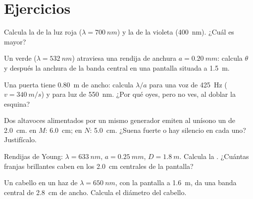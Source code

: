 \section{Ejercicios}

\begin{exercise}[$\star$]\label{exo:g12:light-as-wave:1}
Calcula la  de la luz roja ($\lambda = \qty{700}{nm}$) y la de
la violeta (\qty{400}{nm}). ¿Cuál es mayor?
\end{exercise}

\begin{exercise}[$\star$]\label{exo:g12:light-as-wave:2}
Un  verde ($\lambda = \qty{532}{nm}$) atraviesa una rendija de
anchura $a = \qty{0.20}{mm}$: calcula $\theta$ y después la anchura de
la banda central en una pantalla situada a \qty{1.5}{m}.
\end{exercise}

\begin{exercise}[$\star$]\label{exo:g12:light-as-wave:3}
Una puerta tiene \qty{0.80}{m} de ancho: calcula $\lambda/a$ para una
voz de \qty{425}{Hz} ($v = \qty{340}{m/s}$) y para luz de
\qty{550}{nm}. ¿Por qué oyes, pero no ves, al doblar la esquina?
\end{exercise}

\begin{exercise}[$\star$]\label{exo:g12:light-as-wave:4}
Dos altavoces alimentados por un mismo generador emiten al unísono un
 de  \qty{2.0}{cm}.  en $M$:
\qty{6.0}{cm}; en $N$: \qty{5.0}{cm}. ¿Suena fuerte o hay silencio en
cada uno? Justifícalo.
\end{exercise}

\begin{exercise}[$\star$]\label{exo:g12:light-as-wave:5}
Rendijas de Young: $\lambda = \qty{633}{nm}$, $a = \qty{0.25}{mm}$,
$D = \qty{1.8}{m}$. Calcula la . ¿Cuántas franjas brillantes
caben en los \qty{2.0}{cm} centrales de la pantalla?
\end{exercise}

\begin{exercise}[$\star\star$]\label{exo:g12:light-as-wave:6}
Un cabello en un haz de $\lambda = \qty{650}{nm}$, con la pantalla a
\qty{1.6}{m}, da una banda central de \qty{2.8}{cm} de ancho. Calcula el
diámetro del cabello.
\end{exercise}

